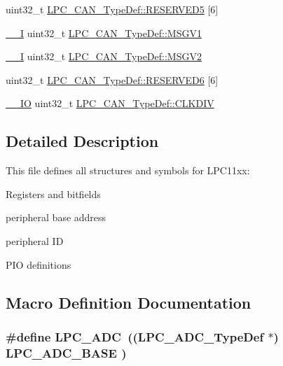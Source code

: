 \begin{DoxyCompactItemize}
\item 
uint32\+\_\+t \hyperlink{group___l_p_c11xx___definitions_gada2e33a50c45e694cde5d08bca108a07}{L\+P\+C\+\_\+\+C\+A\+N\+\_\+\+Type\+Def\+::\+R\+E\+S\+E\+R\+V\+E\+D5} \mbox{[}6\mbox{]}
\item 
\hyperlink{group___c_m_s_i_s__core__definitions_gaf63697ed9952cc71e1225efe205f6cd3}{\+\_\+\+\_\+I} uint32\+\_\+t \hyperlink{group___l_p_c11xx___definitions_ga762d98c04b8192bf57bae042e5c7bfb2}{L\+P\+C\+\_\+\+C\+A\+N\+\_\+\+Type\+Def\+::\+M\+S\+G\+V1}
\item 
\hyperlink{group___c_m_s_i_s__core__definitions_gaf63697ed9952cc71e1225efe205f6cd3}{\+\_\+\+\_\+I} uint32\+\_\+t \hyperlink{group___l_p_c11xx___definitions_ga2237b693c88eca2620ed971623c6db5f}{L\+P\+C\+\_\+\+C\+A\+N\+\_\+\+Type\+Def\+::\+M\+S\+G\+V2}
\item 
uint32\+\_\+t \hyperlink{group___l_p_c11xx___definitions_gac9d8872ef23421105e28b5c87ebcbbc4}{L\+P\+C\+\_\+\+C\+A\+N\+\_\+\+Type\+Def\+::\+R\+E\+S\+E\+R\+V\+E\+D6} \mbox{[}6\mbox{]}
\item 
\hyperlink{group___c_m_s_i_s__core__definitions_gaec43007d9998a0a0e01faede4133d6be}{\+\_\+\+\_\+\+IO} uint32\+\_\+t \hyperlink{group___l_p_c11xx___definitions_ga4a89a19bd8d6a91479a7d60830850bbd}{L\+P\+C\+\_\+\+C\+A\+N\+\_\+\+Type\+Def\+::\+C\+L\+K\+D\+IV}
\end{DoxyCompactItemize}


\subsection{Detailed Description}
This file defines all structures and symbols for L\+P\+C11xx\+:
\begin{DoxyItemize}
\item Registers and bitfields
\item peripheral base address
\item peripheral ID
\item P\+IO definitions 
\end{DoxyItemize}

\subsection{Macro Definition Documentation}
\subsubsection[{\texorpdfstring{L\+P\+C\+\_\+\+A\+DC}{LPC_ADC}}]{\setlength{\rightskip}{0pt plus 5cm}\#define L\+P\+C\+\_\+\+A\+DC~(({\bf L\+P\+C\+\_\+\+A\+D\+C\+\_\+\+Type\+Def}    $\ast$) {\bf L\+P\+C\+\_\+\+A\+D\+C\+\_\+\+B\+A\+SE}   )}\hypertarget{group___l_p_c11xx___definitions_gab6eaf639d3a1eec83583a9e11ab7336f}{}\label{group___l_p_c11xx___definitions_gab6eaf639d3a1eec83583a9e11ab7336f}


